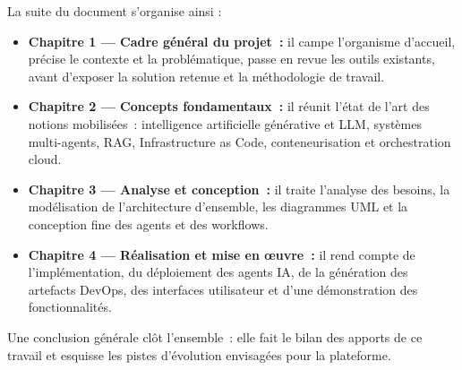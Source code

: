 \bigskip

\noindent La suite du document s'organise ainsi :

\begin{itemize}
    \item \textbf{Chapitre 1 --- Cadre général du projet~:} il campe l'organisme d'accueil,
    précise le contexte et la problématique, passe en revue les outils existants, avant
    d'exposer la solution retenue et la méthodologie de travail.

    \item \textbf{Chapitre 2 --- Concepts fondamentaux~:} il réunit l'état de l'art des
    notions mobilisées~: intelligence artificielle générative et LLM, systèmes multi-agents,
    RAG, Infrastructure as Code, conteneurisation et orchestration cloud.

    \item \textbf{Chapitre 3 --- Analyse et conception~:} il traite l'analyse des besoins,
    la modélisation de l'architecture d'ensemble, les diagrammes UML et la conception fine
    des agents et des workflows.

    \item \textbf{Chapitre 4 --- Réalisation et mise en œuvre~:} il rend compte de
    l'implémentation, du déploiement des agents IA, de la génération des artefacts DevOps,
    des interfaces utilisateur et d'une démonstration des fonctionnalités.
\end{itemize}

\bigskip

\noindent Une conclusion générale clôt l'ensemble~: elle fait le bilan des apports de ce
travail et esquisse les pistes d'évolution envisagées pour la plateforme.

